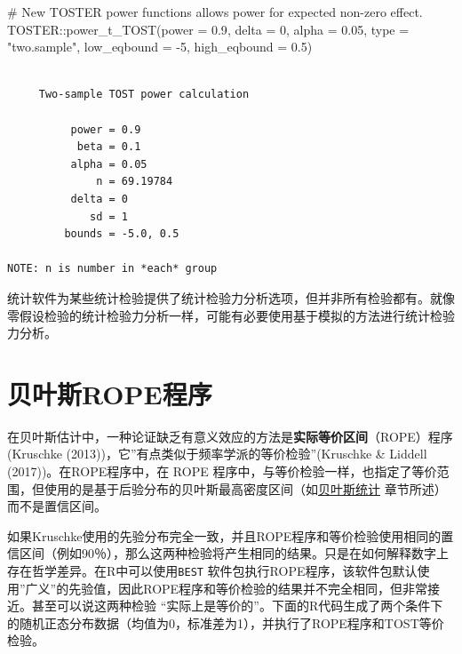 \documentclass[
  letterpaper,
  DIV=11,
  numbers=noendperiod]{scrreprt}
\newenvironment{Shaded}{\begin{snugshade}}{\end{snugshade}}
\newcommand{\AttributeTok}[1]{\textcolor[rgb]{0.40,0.45,0.13}{#1}}
\newcommand{\CommentTok}[1]{\textcolor[rgb]{0.37,0.37,0.37}{#1}}
\newcommand{\DecValTok}[1]{\textcolor[rgb]{0.68,0.00,0.00}{#1}}
\newcommand{\FloatTok}[1]{\textcolor[rgb]{0.68,0.00,0.00}{#1}}
\newcommand{\FunctionTok}[1]{\textcolor[rgb]{0.28,0.35,0.67}{#1}}
\newcommand{\NormalTok}[1]{\textcolor[rgb]{0.00,0.23,0.31}{#1}}
\newcommand{\SpecialCharTok}[1]{\textcolor[rgb]{0.37,0.37,0.37}{#1}}
\newcommand{\StringTok}[1]{\textcolor[rgb]{0.13,0.47,0.30}{#1}}
\begin{document}
\begin{Shaded}
\begin{Highlighting}[]
\CommentTok{\# New TOSTER power functions allows power for expected non{-}zero effect.}
\NormalTok{TOSTER}\SpecialCharTok{::}\FunctionTok{power\_t\_TOST}\NormalTok{(}\AttributeTok{power =} \FloatTok{0.9}\NormalTok{, }\AttributeTok{delta =} \DecValTok{0}\NormalTok{,}
                     \AttributeTok{alpha =} \FloatTok{0.05}\NormalTok{, }\AttributeTok{type =} \StringTok{"two.sample"}\NormalTok{,}
                     \AttributeTok{low\_eqbound =} \SpecialCharTok{{-}}\DecValTok{5}\NormalTok{, }\AttributeTok{high\_eqbound =} \FloatTok{0.5}\NormalTok{)}
\end{Highlighting}
\end{Shaded}

\begin{verbatim}

     Two-sample TOST power calculation 

          power = 0.9
           beta = 0.1
          alpha = 0.05
              n = 69.19784
          delta = 0
             sd = 1
         bounds = -5.0, 0.5

NOTE: n is number in *each* group
\end{verbatim}

统计软件为某些统计检验提供了统计检验力分析选项，但并非所有检验都有。就像零假设检验的统计检验力分析一样，可能有必要使用基于模拟的方法进行统计检验力分析。

\hypertarget{sec-ROPE}{%
\section{贝叶斯ROPE程序}\label{sec-ROPE}}

在贝叶斯估计中，一种论证缺乏有意义效应的方法是\textbf{实际等价区间}（ROPE）程序(Kruschke
(2013))，它''有点类似于频率学派的等价检验''(Kruschke \& Liddell
(2017))。在ROPE程序中，在 ROPE
程序中，与等价检验一样，也指定了等价范围，但使用的是基于后验分布的贝叶斯最高密度区间（如\protect\hyperlink{bayes}{贝叶斯统计}
章节所述）而不是置信区间。

如果Kruschke使用的先验分布完全一致，并且ROPE程序和等价检验使用相同的置信区间（例如90％），那么这两种检验将产生相同的结果。只是在如何解释数字上存在哲学差异。在R中可以使用\texttt{BEST}
软件包执行ROPE程序，该软件包默认使用''广义''的先验值，因此ROPE程序和等价检验的结果并不完全相同，但非常接近。甚至可以说这两种检验
``实际上是等价的''。下面的R代码生成了两个条件下的随机正态分布数据（均值为0，标准差为1），并执行了ROPE程序和TOST等价检验。
\end{document}
